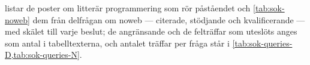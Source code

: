  listar de poster om litterär programmering som
rör påståendet och \cref{tab:sok-noweb} dem från delfrågan om noweb ---
citerade, stödjande och kvalificerande --- med skälet till varje beslut;
de angränsande och de felträffar som uteslöts anges som antal i
tabelltexterna, och antalet träffar per fråga står i
\cref{tab:sok-queries-D,tab:sok-queries-N}.

